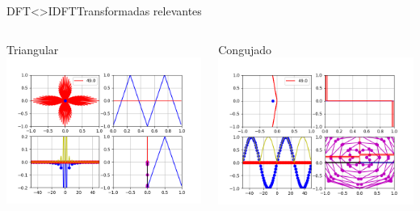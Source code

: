 \begin{frame}{DFT<>IDFT}{Transformadas relevantes}
   \begin{columns}[c]
      \begin{column}{.5\textwidth}
         Triangular
         \centering\includegraphics[width=1.0\textwidth]{3_clase/euler_triangular}
      \end{column}
      \begin{column}{.5\textwidth}
         Congujado
         \centering\includegraphics[width=1.0\textwidth]{3_clase/euler_conjugado}
      \end{column}
   \end{columns}
   \vfill
\end{frame}
